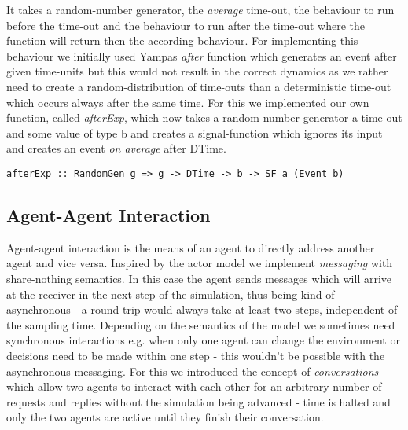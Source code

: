 It takes a random-number generator, the \textit{average} time-out, the behaviour to run before the time-out and the behaviour to run after the time-out where the function will return then the according behaviour. For implementing this behaviour we initially used Yampas \textit{after} function which generates an event after given time-units but this would not result in the correct dynamics as we rather need to create a random-distribution of time-outs than a deterministic time-out which occurs always after the same time. For this we implemented our own function, called \textit{afterExp}, which now takes a random-number generator a time-out and some value of type b and creates a signal-function which ignores its input and creates an event \textit{on average} after DTime.

\begin{verbatim}
afterExp :: RandomGen g => g -> DTime -> b -> SF a (Event b)
\end{verbatim}

\subsection{Agent-Agent Interaction}
\label{sub:agent_agent_inter}

Agent-agent interaction is the means of an agent to directly address another agent and vice versa. Inspired by the actor model we implement  \textit{messaging} with share-nothing semantics. In this case the agent sends messages which will arrive at the receiver in the next step of the simulation, thus being kind of asynchronous - a round-trip would always take at least two steps, independent of the sampling time. Depending on the semantics of the model we sometimes need synchronous interactions e.g. when only one agent can change the environment or decisions need to be made within one step - this wouldn't be possible with the asynchronous messaging. For this we introduced the concept of \textit{conversations} which allow two agents to interact with each other for an arbitrary number of requests and replies without the simulation being advanced - time is halted and only the two agents are active until they finish their conversation.

